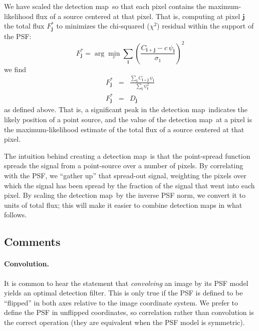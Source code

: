 \documentclass[letterpaper,preprint]{aastex}
\newcommand{\detmap}{detection map}
\newcommand{\snr}[1]{\mathbb{SN}(#1)}
\newcommand{\norm}[1]{\left\lVert #1 \right\rVert}
\renewcommand{\vec}[1]{\boldsymbol{#1}}
\newcommand{\ivec}{\vec{i}}
\newcommand{\jvec}{\vec{j}}
\newcommand{\kvec}{\vec{k}}
\begin{document}
We have scaled the \detmap\ so that each pixel contains the
maximum-likelihood flux of a source centered at that pixel.
That is, computing at pixel $\jvec$ the total flux
$F^{\ast}_{\jvec}$ to minimizes the chi-squared ($\chi^2$) residual
within the support of the PSF:
\begin{equation}
  F^{\ast}_{\jvec} = \arg\min_{c} \sum_{\ivec} \left( \frac{C_{\ivec+\jvec} - c \, \psi_{\ivec}}{\sigma_1} \right)^2
\end{equation}
we find
\begin{eqnarray}
  F^{\ast}_{\jvec} &=& \frac{\sum_{\ivec} C_{\ivec+\jvec} \, \psi_{\ivec}}{\sum_{\ivec} \psi_{\ivec}^2}
  \\
  F^{\ast}_{\jvec} &=& D_{\jvec}
\end{eqnarray}
as defined above.
%
That is, a significant peak in the \detmap\ indicates the likely
position of a point source, and the value of the \detmap\ at a pixel
is the maximum-likelihood estimate of the total flux of a
source centered at that pixel.


The intuition behind creating a \detmap\ is that the point-spread
function spreads the signal from a point-source over a number of
pixels.  By correlating with the PSF, we ``gather up'' that spread-out
signal, weighting the pixels over which the signal has been spread by
the fraction of the signal that went into each pixel.  By scaling the
\detmap\ by the inverse PSF norm, we convert it to units of total flux;
this will make it easier to combine \detmap s in what follows.



\subsection{Comments}

\paragraph{Convolution.}  It is common to hear the statement
that \emph{convolving} an image by its PSF model yields an optimal
detection filter.  This is only true if the PSF is defined to be
``flipped'' in both axes relative to the image coordinate system.  We
prefer to define the PSF in unflipped coordinates, so correlation
rather than convolution is the correct operation (they are equivalent
when the PSF model is symmetric).
\end{document}
